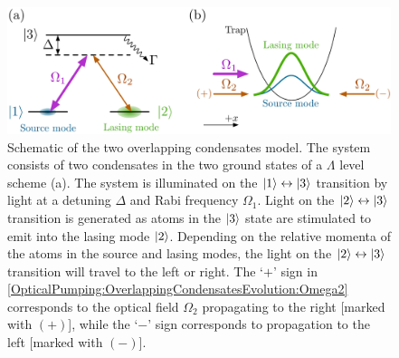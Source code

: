\begin{figure}
    \centering
    \includegraphics[width=14cm]{OverlappingCondensateModel}
    \caption{Schematic of the two overlapping condensates model.  The system consists of two condensates in the two ground states of a $\Lambda$ level scheme (a).  The system is illuminated on the ${\left|1\right>}\leftrightarrow{\ensuremath{\left|3\right>}}$ transition by light at a detuning $\Delta$ and Rabi frequency $\Omega_1$.  Light on the ${\left|2\right>} \leftrightarrow {\ensuremath{\left|3\right>}}$ transition is generated as atoms in the ${\left|3\right>}$ state are stimulated to emit into the lasing mode ${\left|2\right>}$.  Depending on the relative momenta of the atoms in the source and lasing modes, the light on the ${\left|2\right>} \leftrightarrow {\ensuremath{\left|3\right>}}$ transition will travel to the left or right.  The `$+$' sign in \eqref{OpticalPumping:OverlappingCondensatesEvolution:Omega2} corresponds to the optical field $\Omega_2$ propagating to the right [marked with $(+)$], while the `$-$' sign corresponds to propagation to the left [marked with $(-)$].}
    \label{OpticalPumping:OverlappingCondensateModel}
\end{figure}

